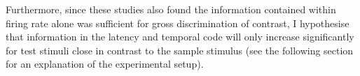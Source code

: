 Furthermore, since these studies \cite{Reich2001,Arabzadeh2006} also found the information contained within firing rate alone was sufficient for gross discrimination of contrast, I hypothesise that information in the latency and temporal code will only increase significantly for test stimuli close in contrast to the sample stimulus (see the following section for an explanation of the experimental setup).

